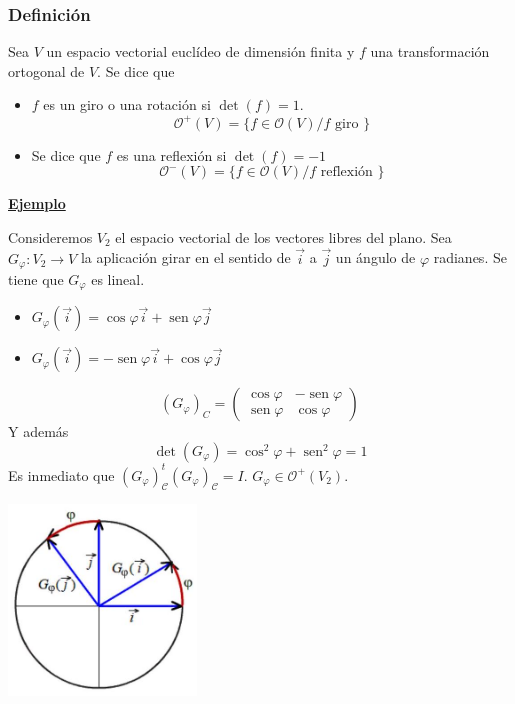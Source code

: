 \documentclass[12pt, a4paper, ones, notitlepage, openany,titlepage]{article}
\newcommand{\ejemplo}{\noindent\underline{\textbf{Ejemplo}}}
\begin{document}
\subsubsection{Definición}
Sea $V$ un espacio vectorial euclídeo de dimensión finita y $f$ una transformación ortogonal de $V$. Se dice que
\begin{itemize}
	\item $f$ es un giro o una rotación si $\operatorname{det}(f)=1$.
	$$
	\mathcal{O}^+(V) = \{f \in \mathcal{O}(V) / f \text{ giro }\}
	$$
	\item Se dice que $f$ es una reflexión si $\operatorname{det}(f)=-1$
	$$
	\mathcal{O}^-(V) = \{f \in \mathcal{O}(V) / f \text{ reflexión }\}
	$$
\end{itemize}

\ejemplo

Consideremos $V_2$ el espacio vectorial de los vectores libres del plano. Sea $G_\varphi : V_2 \to V$ la aplicación girar en el sentido de $\overrightarrow{i}$ a $\overrightarrow{j}$ un ángulo de $\varphi$ radianes. Se tiene que $G_\varphi$ es lineal.
\begin{itemize}
	\item $G_\varphi (\overrightarrow{i}) = \operatorname{cos} \varphi \overrightarrow{i} + \operatorname{sen} \varphi \overrightarrow{j}$
	\item $G_\varphi (\overrightarrow{i}) = -\operatorname{sen} \varphi \overrightarrow{i} + \operatorname{cos} \varphi \overrightarrow{j}$
\end{itemize}

$$
\left(G_{\varphi}\right)_{C}=\left(\begin{array}{rr}
	\cos \varphi & -\operatorname{sen} \varphi \\
	\operatorname{sen} \varphi & \cos \varphi
\end{array}\right)
$$
Y además
$$
\operatorname{det}(G_\varphi) = \operatorname{cos}^2 \varphi + \operatorname{sen}^2 \varphi = 1
$$
Es inmediato que $(G_\varphi)^t_\mathcal{C} (G_\varphi)_\mathcal{C} = I$. $G_\varphi \in \mathcal{O}^+(V_2)$.

\begin{center}
	\includegraphics[max width=5cm]{2023_03_20_c2fe6c117849a1a0e8afg-052}
\end{center}
\end{document}
